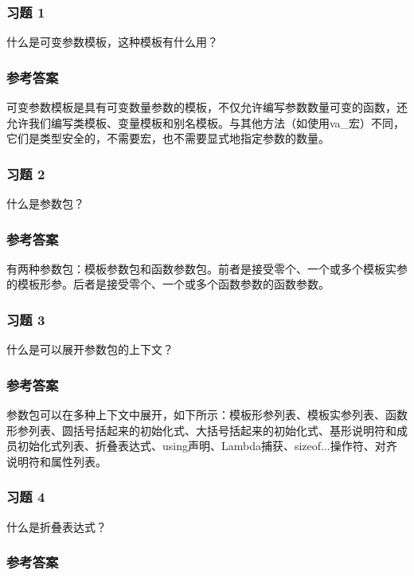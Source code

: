 \subsubsection{习题 1}

什么是可变参数模板，这种模板有什么用？

\subsubsection{参考答案}

可变参数模板是具有可变数量参数的模板，不仅允许编写参数数量可变的函数，还允许我们编写类模板、变量模板和别名模板。与其他方法（如使用va_宏）不同，它们是类型安全的，不需要宏，也不需要显式地指定参数的数量。


\subsubsection{习题 2}

什么是参数包？

\subsubsection{参考答案}

有两种参数包：模板参数包和函数参数包。前者是接受零个、一个或多个模板实参的模板形参。后者是接受零个、一个或多个函数参数的函数参数。

\subsubsection{习题 3}

什么是可以展开参数包的上下文？

\subsubsection{参考答案}

参数包可以在多种上下文中展开，如下所示：模板形参列表、模板实参列表、函数形参列表、圆括号括起来的初始化式、大括号括起来的初始化式、基形说明符和成员初始化式列表、折叠表达式、using声明、Lambda捕获、sizeof...操作符、对齐说明符和属性列表。

\subsubsection{习题 4}

什么是折叠表达式？

\subsubsection{参考答案}

